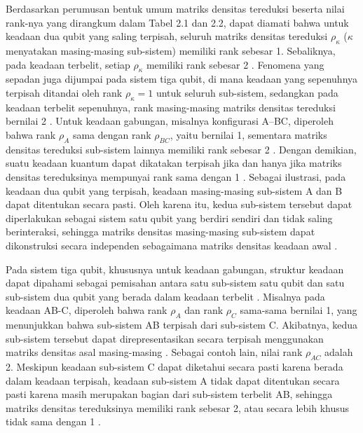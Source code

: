 \par
Berdasarkan perumusan bentuk umum matriks densitas tereduksi beserta nilai rank-nya yang dirangkum dalam Tabel 2.1 dan 2.2, dapat diamati bahwa untuk keadaan dua qubit yang saling terpisah, seluruh matriks densitas tereduksi $\rho_\kappa$ ($\kappa$ menyatakan masing-masing sub-sistem) memiliki rank sebesar 1. Sebaliknya, pada keadaan terbelit, setiap $\rho_\kappa$ memiliki rank sebesar 2 \cite{nielsen2010quantum,horodecki2009quantum}. Fenomena yang sepadan juga dijumpai pada sistem tiga qubit, di mana keadaan yang sepenuhnya terpisah ditandai oleh rank $\rho_\kappa = 1$ untuk seluruh sub-sistem, sedangkan pada keadaan terbelit sepenuhnya, rank masing-masing matriks densitas tereduksi bernilai 2 \cite{horodecki2009quantum}. Untuk keadaan gabungan, misalnya konfigurasi A–BC, diperoleh bahwa rank $\rho_A$ sama dengan rank $\rho_{BC}$, yaitu bernilai 1, sementara matriks densitas tereduksi sub-sistem lainnya memiliki rank sebesar 2 \cite{dur2000three}. Dengan demikian, suatu keadaan kuantum dapat dikatakan terpisah jika dan hanya jika matriks densitas tereduksinya mempunyai rank sama dengan 1 \cite{nielsen2010quantum,bengtsson2017geometry}. Sebagai ilustrasi, pada keadaan dua qubit yang terpisah, keadaan masing-masing sub-sistem A dan B dapat ditentukan secara pasti. Oleh karena itu, kedua sub-sistem tersebut dapat diperlakukan sebagai sistem satu qubit yang berdiri sendiri dan tidak saling berinteraksi, sehingga matriks densitas masing-masing sub-sistem dapat dikonstruksi secara independen sebagaimana matriks densitas keadaan awal \cite{nielsen2010quantum}.
\par
Pada sistem tiga qubit, khususnya untuk keadaan gabungan, struktur keadaan dapat dipahami sebagai pemisahan antara satu sub-sistem satu qubit dan satu sub-sistem dua qubit yang berada dalam keadaan terbelit \cite{dur2000three}. Misalnya pada keadaan AB-C, diperoleh bahwa rank $\rho_A$ dan rank $\rho_C$ sama-sama bernilai 1, yang menunjukkan bahwa sub-sistem AB terpisah dari sub-sistem C. Akibatnya, kedua sub-sistem tersebut dapat direpresentasikan secara terpisah menggunakan matriks densitas asal masing-masing \cite{dur2000three}. Sebagai contoh lain, nilai rank $\rho_{AC}$ adalah 2. Meskipun keadaan sub-sistem C dapat diketahui secara pasti karena berada dalam keadaan terpisah, keadaan sub-sistem A tidak dapat ditentukan secara pasti karena masih merupakan bagian dari sub-sistem terbelit AB, sehingga matriks densitas tereduksinya memiliki rank sebesar 2, atau secara lebih khusus tidak sama dengan 1 \cite{horodecki2009quantum,bengtsson2017geometry}.

